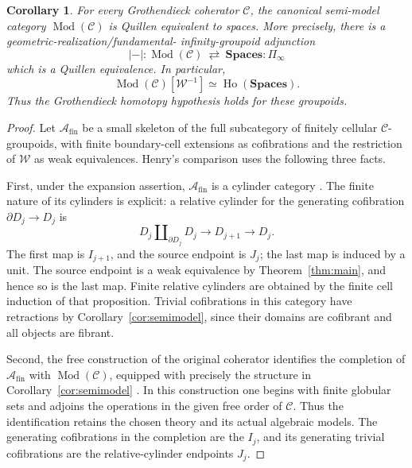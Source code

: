\documentclass[11pt,letterpaper]{article}
\numberwithin{equation}{section}
\theoremstyle{plain}
\newtheorem{corollary}[theorem]{Corollary}
\theoremstyle{definition}
\theoremstyle{remark}
\begin{document}
\begin{corollary}\label{cor:homotopy-hypothesis}
For every Grothendieck coherator \(\mathcal C\), the canonical
semi-model category \(\operatorname{Mod}(\mathcal C)\) is Quillen equivalent to
spaces.  More precisely, there is a geometric-realization/fundamental-
infinity-groupoid adjunction
\[
 |-|:\operatorname{Mod}(\mathcal C)\ \rightleftarrows\ \mathbf{Spaces}:\Pi_\infty
\]
which is a Quillen equivalence.  In particular,
\[
 \operatorname{Mod}(\mathcal C)[\mathcal W^{-1}]
       \simeq \operatorname{Ho}(\mathbf{Spaces}).
\]
Thus the Grothendieck homotopy hypothesis holds for these groupoids.
\end{corollary}

\begin{proof}
Let \(\mathcal A_{\mathrm{fin}}\) be a small skeleton of the full
subcategory of finitely cellular \(\mathcal C\)-groupoids, with finite boundary-cell
extensions as cofibrations and the restriction of \(\mathcal W\)
as weak equivalences.  Henry's comparison uses the following three
facts.

First, under the expansion assertion, \(\mathcal A_{\mathrm{fin}}\)
is a cylinder category
\cite[Proposition~5.3.6]{Henry2016}.  The finite nature of its
cylinders is explicit: a relative cylinder for the generating
cofibration \(\partial D_j\to D_j\) is
\[
 D_j\amalg_{\partial D_j}D_j
       \longrightarrow D_{j+1}\longrightarrow D_j.
\]
The first map is \(I_{j+1}\), and the source endpoint is \(J_j\);
the last map is induced by a unit.  The source endpoint is a weak
equivalence by Theorem~\ref{thm:main}, and hence so is the last map.
Finite relative cylinders are obtained by the finite cell induction
of that proposition.  Trivial cofibrations in this category have
retractions by Corollary~\ref{cor:semimodel}, since their domains are
cofibrant and all objects are fibrant.

Second, the free construction of the original coherator identifies
the completion of \(\mathcal A_{\mathrm{fin}}\) with
\(\operatorname{Mod}(\mathcal C)\), equipped with precisely the structure in
Corollary~\ref{cor:semimodel}
\cite[Proposition~5.3.7]{Henry2016}.  In this construction one begins
with finite globular sets and adjoins the operations in the given
free order of \(\mathcal C\).  Thus the identification retains the
chosen theory and its actual algebraic models.  The generating
cofibrations in the completion are the \(I_j\), and its generating
trivial cofibrations are the relative-cylinder endpoints \(J_j\).


\end{proof}
\end{document}
